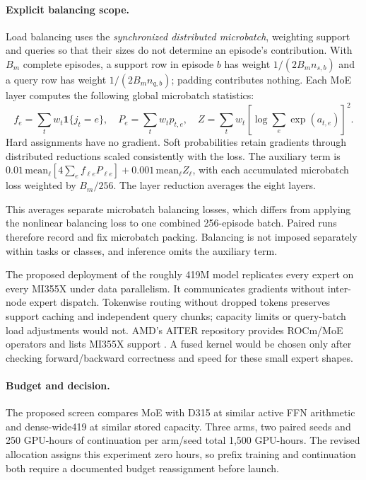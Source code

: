\documentclass[11pt]{article}
\newcommand{\ind}{\mathbf{1}}
\begin{document}
\paragraph{Explicit balancing scope.}
Load balancing uses the \emph{synchronized distributed microbatch}, weighting support and queries so that their sizes do not determine an episode's contribution. With $B_m$ complete episodes, a support row in episode $b$ has weight $1/(2B_mn_{s,b})$ and a query row has weight $1/(2B_mn_{q,b})$; padding contributes nothing. Each MoE layer computes the following global microbatch statistics:
\[
f_e=\sum_t w_t\ind\{j_t=e\},\quad P_e=\sum_t w_tp_{t,e},\quad
Z=\sum_t w_t\left[\log\sum_e\exp(a_{t,e})\right]^2.
\]
Hard assignments have no gradient. Soft probabilities retain gradients through distributed reductions scaled consistently with the loss. The auxiliary term is $0.01\,\mathrm{mean}_{\ell}[4\sum_e f_{\ell e}P_{\ell e}]+0.001\,\mathrm{mean}_{\ell}Z_\ell$, with each accumulated microbatch loss weighted by $B_m/256$. The layer reduction averages the eight layers.

This averages separate microbatch balancing losses, which differs from applying the nonlinear balancing loss to one combined 256-episode batch. Paired runs therefore record and fix microbatch packing. Balancing is not imposed separately within tasks or classes, and inference omits the auxiliary term.

The proposed deployment of the roughly 419M model replicates every expert on every MI355X under data parallelism. It communicates gradients without inter-node expert dispatch. Tokenwise routing without dropped tokens preserves support caching and independent query chunks; capacity limits or query-batch load adjustments would not. AMD's AITER repository provides ROCm/MoE operators and lists MI355X support \cite{aiter}. A fused kernel would be chosen only after checking forward/backward correctness and speed for these small expert shapes.

\paragraph{Budget and decision.}
The proposed screen compares MoE with D315 at similar active FFN arithmetic and dense-wide419 at similar stored capacity. Three arms, two paired seeds and 250 GPU-hours of continuation per arm/seed total 1,500 GPU-hours. The revised allocation assigns this experiment zero hours, so prefix training and continuation both require a documented budget reassignment before launch.
\end{document}
